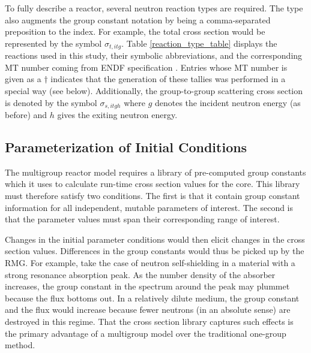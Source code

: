 To fully describe a reactor, several neutron reaction types are required.  The type 
also augments the group constant notation by being a comma-separated preposition to 
the index.  For example, the total cross section would be represented by the symbol 
$\sigma_{t,itg}$. Table \ref{reaction_type_table} displays the reactions used in this 
study, their symbolic abbreviations, and the corresponding MT number coming from ENDF 
specification \cite{MFMT}.  Entries whose MT number is given as a $\dagger$ indicates 
that the generation of these tallies was performed in a special way (see below).
Additionally, the group-to-group scattering cross section is denoted by the symbol
$\sigma_{s,itgh}$ where $g$ denotes the incident neutron energy (as before) and $h$
gives the exiting neutron energy.

\subsection{Parameterization of Initial Conditions}
The multigroup reactor model requires a library of pre-computed group constants which it uses
to calculate run-time cross section values for the core.  This library must therefore satisfy 
two conditions.  The first is that it contain group constant information for all independent, 
mutable parameters of interest.  The second is that the parameter values must span 
their corresponding range of interest.  

Changes in the initial parameter conditions would then elicit changes in the cross section 
values. Differences in the group constants would thus be picked up by the RMG.  For example, 
take the case of neutron self-shielding in a material with a strong resonance absorption peak.  
As the number density of the absorber increases, the group constant in the spectrum around 
the peak may plummet because the flux bottoms out.  In a relatively dilute medium, the group 
constant and the flux would increase because fewer neutrons (in an absolute sense) are destroyed 
in this regime.  That the  cross section library captures such effects is the primary advantage 
of a multigroup model over the traditional one-group method.

